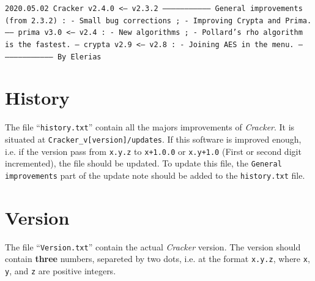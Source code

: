 \documentclass[a4paper,10pt]{report}
\begin{document}
   \begin{framed}
    \texttt{2020.05.02 \newline
	   \indent Cracker v2.4.0 <-- v2.3.2 \newline
	   \indent --------------------------------- \newline
	   \indent General improvements (from 2.3.2) : \newline
	   \indent \indent - Small bug corrections ; \newline
	   \indent \indent - Improving Crypta and Prima. \newline
	   \indent ------ \newline \newline
	   \indent prima v3.0 <-- v2.4 : \newline
	   \indent \indent - New algorithms ; \newline
	   \indent \indent - Pollard's rho algorithm is the fastest. \newline
	   \indent --- \newline \newline
	   \indent crypta v2.9 <-- v2.8 : \newline
	   \indent \indent - Joining AES in the menu. \newline
	   \indent --- \newline \newline
	   \indent --------------------------------- \newline
	   \indent By Elerias}
   \end{framed}

  
  \section{History}
   The file ``\texttt{history.txt}'' contain all the majors improvements of \emph{Cracker}. It is situated at \texttt{Cracker\_v[version]/updates}. If this software is improved enough, i.e. if the version pass from \texttt{x.y.z} to \texttt{x+1.0.0} or \texttt{x.y+1.0} (First or second digit incremented), the file should be updated. To update this file, the \texttt{General improvements} part of the update note should be added to the \texttt{history.txt} file.
  
  \section{Version}
   The file ``\texttt{Version.txt}'' contain the actual \emph{Cracker} version. The version should contain \textbf{three} numbers, separeted by two dots, i.e. at the format \texttt{x.y.z}, where \texttt{x}, \texttt{y}, and \texttt{z} are positive integers. \newline
   
\end{document}
